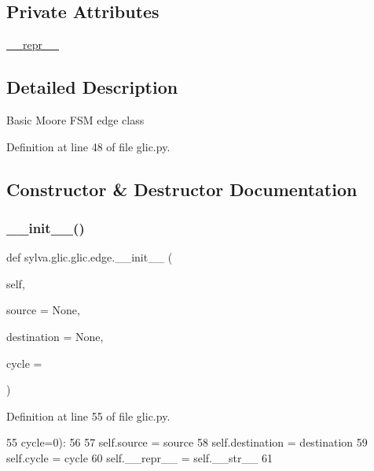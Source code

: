 \subsection*{Private Attributes}
\begin{DoxyCompactItemize}
\item 
\hyperlink{classsylva_1_1glic_1_1glic_1_1edge_a30be603f8a2b6d9c9cc2da06ce2444c1}{\+\_\+\+\_\+repr\+\_\+\+\_\+}
\end{DoxyCompactItemize}


\subsection{Detailed Description}
\begin{DoxyVerb}  Basic Moore FSM edge class
\end{DoxyVerb}
 

Definition at line 48 of file glic.\+py.



\subsection{Constructor \& Destructor Documentation}
\mbox{\label{classsylva_1_1glic_1_1glic_1_1edge_a457302dcf6988c35a0dc6eb4910700d5}} 
\subsubsection{\texorpdfstring{\+\_\+\+\_\+init\+\_\+\+\_\+()}{\_\_init\_\_()}}
{\footnotesize\ttfamily def sylva.\+glic.\+glic.\+edge.\+\_\+\+\_\+init\+\_\+\+\_\+ (\begin{DoxyParamCaption}\item[{}]{self,  }\item[{}]{source = {\ttfamily None},  }\item[{}]{destination = {\ttfamily None},  }\item[{}]{cycle = {} }\end{DoxyParamCaption})}



Definition at line 55 of file glic.\+py.


\begin{DoxyCode}
55                  cycle=0):
56 
57       self.source = source
58       self.destination = destination
59       self.cycle = cycle
60       self.\_\_repr\_\_ = self.\_\_str\_\_
61 
\end{DoxyCode}



